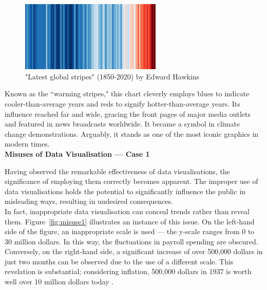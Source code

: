 \documentclass{article}\usepackage[]{graphicx}\usepackage[]{xcolor}
\numberwithin{equation}{section}
\begin{document}
\begin{figure}[H]
    \centering
    \includegraphics[width=0.6\textwidth]{image_reference/global.png}
    \caption{"Latest global stripes" (1850-2020) by Edward Hawkins}
    \label{fig:global}
\end{figure}

\noindent 
Known as the ``warming stripes," this chart cleverly employs blues to indicate cooler-than-average years and reds to signify hotter-than-average years. Its influence reached far and wide, gracing the front pages of major media outlets and featured in news broadcasts worldwide. It became a symbol in climate change demonstrations. Arguably, it stands as one of the most iconic graphics in modern times.\\

\noindent
\textbf{Misuses of Data Visualisation — Case 1}

\noindent
Having observed the remarkable effectiveness of data visualisations, the significance of employing them correctly becomes apparent. The improper use of data visualisations holds the potential to significantly influence the public in misleading ways, resulting in undesired consequences.\\

\noindent
In fact, inappropriate data visualisation can conceal trends rather than reveal them. Figure~\ref{fig:misuse1} \cite{lie, liestats} illustrates an instance of this issue. On the left-hand side of the figure, an inappropriate scale is used — the y-scale ranges from 0 to 30 million dollars. In this way, the fluctuations in payroll spending are obscured. Conversely, on the right-hand side, a significant increase of over 500,000 dollars in just two months can be observed due to the use of a different scale. This revelation is substantial; considering inflation, 500,000 dollars in 1937 is worth well over 10 million dollars today \cite{worth}.\\
\end{document}
